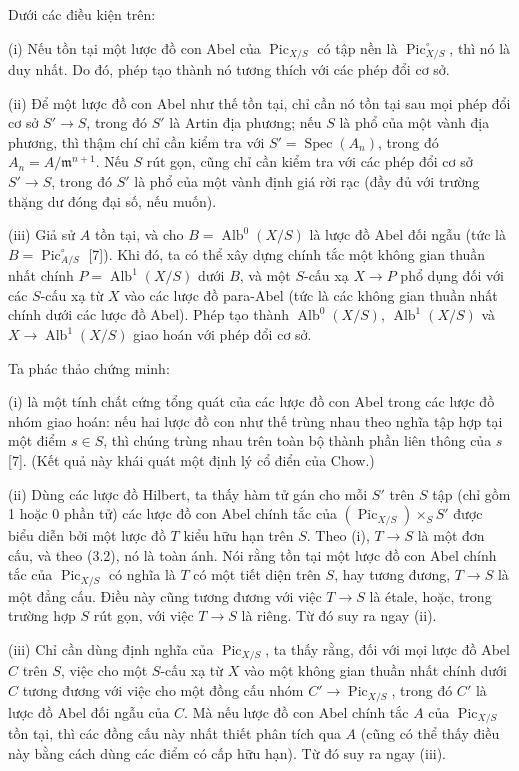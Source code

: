  Dưới các điều kiện trên:

\noindent(i) Nếu tồn tại một lược đồ con Abel của
$\operatorname{Pic}_{X/S}$ có tập nền là
$\operatorname{Pic}_{X/S}^\circ$, thì nó là duy nhất. Do đó, phép tạo thành
nó tương thích với các phép đổi cơ sở.

\noindent(ii) Để một lược đồ con Abel như thế tồn tại, chỉ cần nó tồn tại sau
mọi phép đổi cơ sở $S'\longrightarrow S$, trong đó $S'$ là Artin địa phương;
nếu $S$ là phổ của một vành địa phương, thì thậm chí chỉ cần kiểm tra với
$S'=\operatorname{Spec}(A_n)$, trong đó
$A_n=A/\mathfrak m^{n+1}$. Nếu $S$ rút gọn, cũng chỉ cần kiểm tra với các phép
đổi cơ sở $S'\longrightarrow S$, trong đó $S'$ là phổ của một vành định giá
rời rạc (đầy đủ với trường thặng dư đóng đại số, nếu muốn).

\noindent(iii) Giả sử $A$ tồn tại, và cho
$B=\operatorname{Alb}^0(X/S)$ là lược đồ Abel đối ngẫu (tức là
$B=\operatorname{Pic}_{A/S}^\circ$ [7]). Khi đó, ta có thể xây dựng chính tắc
một không gian thuần nhất chính $P=\operatorname{Alb}^1(X/S)$ dưới $B$, và
một $S$-cấu xạ $X\longrightarrow P$ phổ dụng đối với các $S$-cấu xạ từ $X$
vào các lược đồ para-Abel (tức là các không gian thuần nhất chính dưới các
lược đồ Abel). Phép tạo thành $\operatorname{Alb}^0(X/S)$,
$\operatorname{Alb}^1(X/S)$ và
$X\longrightarrow\operatorname{Alb}^1(X/S)$ giao hoán với phép đổi cơ sở.

Ta phác thảo chứng minh:

(i) là một tính chất cứng tổng quát của các lược đồ con Abel trong các lược đồ
nhóm giao hoán: nếu hai lược đồ con như thế trùng nhau theo nghĩa tập hợp tại
một điểm $s\in S$, thì chúng trùng nhau trên toàn bộ thành phần
liên thông của $s$ [7]. (Kết quả này khái quát một định lý cổ điển của Chow.)

(ii) Dùng các lược đồ Hilbert, ta thấy hàm tử gán cho mỗi $S'$ trên $S$ tập
(chỉ gồm 1 hoặc 0 phần tử) các lược đồ con Abel chính tắc của
$(\operatorname{Pic}_{X/S})\times_S S'$ được biểu diễn bởi một lược đồ $T$
kiểu hữu hạn trên $S$. Theo (i), $T\longrightarrow S$ là một đơn cấu, và theo
(3.2), nó là toàn ánh. Nói rằng tồn tại một lược đồ con Abel chính tắc của
$\operatorname{Pic}_{X/S}$ có nghĩa là $T$ có một tiết diện trên $S$, hay
tương đương, $T\longrightarrow S$ là một đẳng cấu. Điều này cũng tương đương
với việc $T\longrightarrow S$ là étale, hoặc, trong trường hợp $S$ rút gọn,
với việc $T\longrightarrow S$ là riêng. Từ đó suy ra ngay (ii).

(iii) Chỉ cần dùng định nghĩa của $\operatorname{Pic}_{X/S}$, ta thấy rằng,
đối với mọi lược đồ Abel $C$ trên $S$, việc cho một $S$-cấu xạ từ $X$ vào một
không gian thuần nhất chính dưới $C$ tương đương với việc cho một đồng cấu nhóm
$C'\longrightarrow\operatorname{Pic}_{X/S}$, trong đó $C'$ là lược đồ Abel
đối ngẫu của $C$. Mà nếu lược đồ con Abel chính tắc $A$ của
$\operatorname{Pic}_{X/S}$ tồn tại, thì các đồng cấu này nhất thiết phân tích
qua $A$ (cũng có thể thấy điều này bằng cách dùng các điểm có cấp hữu hạn). Từ
đó suy ra ngay (iii).

